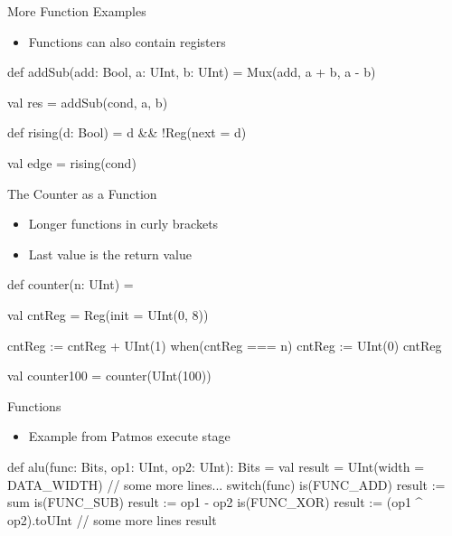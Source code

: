 \documentclass[xcolor=pdflatex,dvipsnames,table]{beamer}
\begin{document}
\begin{frame}[fragile]{More Function Examples}
\begin{itemize}
\item Functions can also contain registers
\end{itemize}
\begin{chisel}
  def addSub(add: Bool, a: UInt, b: UInt) =
    Mux(add, a + b, a - b)

  val res = addSub(cond, a, b)

  def rising(d: Bool) = d && !Reg(next = d)

  val edge = rising(cond)
\end{chisel}
\end{frame}

\begin{frame}[fragile]{The Counter as a Function}
\begin{itemize}
\item Longer functions in curly brackets
\item Last value is the return value
\end{itemize}
\begin{chisel}
def counter(n: UInt) = {
  
  val cntReg = Reg(init = UInt(0, 8))
  
  cntReg := cntReg + UInt(1)
  when(cntReg === n) {
    cntReg := UInt(0)
  }
  cntReg
}

val counter100 = counter(UInt(100))
\end{chisel}
\end{frame}


\begin{frame}[fragile]{Functions}
\begin{itemize}
\item Example from Patmos execute stage
\end{itemize}
\begin{chisel}
def alu(func: Bits, op1: UInt, op2: UInt): Bits = {
  val result = UInt(width = DATA_WIDTH)
  // some more lines...
  switch(func) {
    is(FUNC_ADD) { result := sum }
    is(FUNC_SUB) { result := op1 - op2 }
    is(FUNC_XOR) { result := (op1 ^ op2).toUInt }
    // some more lines
  }
  result
}
\end{chisel}
\end{frame}
\end{document}
